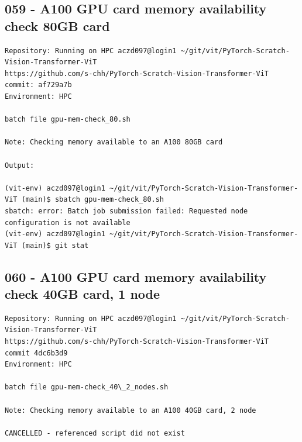 \subsection{059 - A100 GPU card memory availability check 80GB card}
\label{app_res:054}
\begin{verbatim}
Repository: Running on HPC aczd097@login1 ~/git/vit/PyTorch-Scratch-Vision-Transformer-ViT
https://github.com/s-chh/PyTorch-Scratch-Vision-Transformer-ViT
commit: af729a7b
Environment: HPC

batch file gpu-mem-check_80.sh

Note: Checking memory available to an A100 80GB card 

Output: 

(vit-env) aczd097@login1 ~/git/vit/PyTorch-Scratch-Vision-Transformer-ViT (main)$ sbatch gpu-mem-check_80.sh
sbatch: error: Batch job submission failed: Requested node configuration is not available
(vit-env) aczd097@login1 ~/git/vit/PyTorch-Scratch-Vision-Transformer-ViT (main)$ git stat

\end{verbatim}

\subsection{060 - A100 GPU card memory availability check 40GB card, 1 node}
\label{app_res:060}
\begin{verbatim}
Repository: Running on HPC aczd097@login1 ~/git/vit/PyTorch-Scratch-Vision-Transformer-ViT
https://github.com/s-chh/PyTorch-Scratch-Vision-Transformer-ViT
commit 4dc6b3d9
Environment: HPC

batch file gpu-mem-check_40\_2_nodes.sh

Note: Checking memory available to an A100 40GB card, 2 node 

CANCELLED - referenced script did not exist

\end{verbatim}


